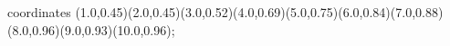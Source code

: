 					coordinates { (1.0,0.45)(2.0,0.45)(3.0,0.52)(4.0,0.69)(5.0,0.75)(6.0,0.84)(7.0,0.88)(8.0,0.96)(9.0,0.93)(10.0,0.96)};